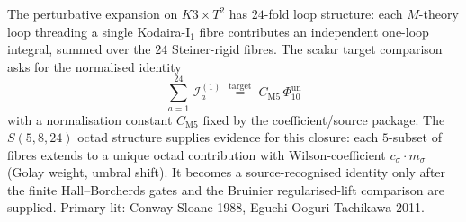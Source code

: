 \begin{remark}
\label{rem:pf-deep-2}
The perturbative expansion on $K3\times T^2$ has $24$-fold loop
structure: each $M$-theory loop threading a single Kodaira-I$_1$ fibre
contributes an independent one-loop integral, summed over the $24$
Steiner-rigid fibres. The scalar target comparison asks for the
normalised identity
\[
\sum_{a=1}^{24}\, \mathcal I^{(1)}_a
\;\stackrel{\mathrm{target}}{=}\;
C_{\mathrm{M5}}\,\Phi_{10}^{\mathrm{un}}
\]
with a normalisation constant $C_{\mathrm{M5}}$ fixed by the
coefficient/source package. The $S(5,8,24)$ octad structure supplies
evidence for this closure: each $5$-subset of fibres extends to a
unique octad contribution with Wilson-coefficient
$c_\sigma\cdot m_\sigma$ (Golay weight, umbral shift). It becomes a
source-recognised identity only after the finite Hall--Borcherds gates
and the Bruinier regularised-lift comparison are supplied. Primary-lit:
Conway-Sloane 1988, Eguchi-Ooguri-Tachikawa 2011.
\end{remark}
